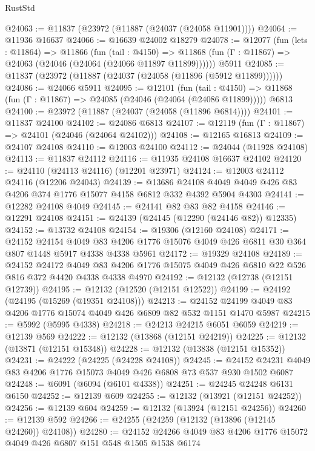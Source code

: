 \begin{lexlean}{RustStd}
\begin{coremodule}
{\begin{coremodule}
{{{{{{{{{{{{{{{{{{{{{{{{{{{{{{{{{{{{{{{{{{{{{{{{{{@24063 := @11837 (@23972 (@11887 (@24037 (@24058 @11901))))
@24064 := @11936 @16637
@24066 := @16639 @24002 @18279
@24078 := @12077
    (fun (lets : @11864) =>
    @11866
      (fun (tail : @4150) =>
      @11868 (fun (Γ : @11867) => @24063 (@24046 (@24064 (@24066 @11897 @11899))))))
    @5911
@24085 := @11837 (@23972 (@11887 (@24037 (@24058 (@11896 (@5912 @11899))))))
@24086 := @24066 @5911
@24095 := @12101
    (fun (tail : @4150) => @11868 (fun (Γ : @11867) => @24085 (@24046 (@24064 (@24086 @11899)))))
    @6813
@24100 := @23972 (@11887 (@24037 (@24058 (@11896 @6814))))
@24101 := @11837 @24100
@24102 := @24086 @6813
@24107 := @12119 (fun (Γ : @11867) => @24101 (@24046 (@24064 @24102)))
@24108 := @12165 @16813
@24109 := @24107 @24108
@24110 := @12003 @24100
@24112 := @24044 (@11928 @24108)
@24113 := @11837 @24112
@24116 := @11935 @24108 @16637 @24102
@24120 := @24110 (@24113 @24116) (@12201 @23971)
@24124 := @12003 @24112 @24116 (@12206 @24043)
@24139 := @13686
    @24108
    @4049
    @4049
    @426
    @83
    @4206
    @374
    @1776
    @15077
    @4158
    @6812
    @332
    @4392
    @5904
    @4303
@24141 := @12282 @24108 @4049
@24145 := @24141 @82 @83 @82 @4158
@24146 := @12291 @24108
@24151 := @24139 (@24145 (@12290 (@24146 @82)) @12335)
@24152 := @13732 @24108
@24154 := @19306 (@12160 @24108)
@24171 := @24152
    @24154
    @4049
    @83
    @4206
    @1776
    @15076
    @4049
    @426
    @6811
    @30
    @364
    @807
    @1448
    @5917
    @4338
    @4338
    @5961
@24172 := @19329 @24108
@24189 := @24152
    @24172
    @4049
    @83
    @4206
    @1776
    @15075
    @4049
    @426
    @6810
    @22
    @526
    @816
    @372
    @4420
    @4338
    @4338
    @4970
@24192 := @12132 (@12738 (@12151 @12739))
@24195 := @12132 (@12520 (@12151 @12522))
@24199 := @24192 (@24195 (@15269 (@19351 @24108)))
@24213 := @24152 @24199 @4049 @83 @4206 @1776 @15074 @4049 @426 @6809 @82 @532 @1151 @1470 @5987
@24215 := @5992 (@5995 @4338)
@24218 := @24213 @24215 @6051 @6059
@24219 := @12139 @569
@24222 := @12132 (@13868 (@12151 @24219))
@24225 := @12132 (@13871 (@12151 @15348))
@24228 := @12132 (@13838 (@12151 @15352))
@24231 := @24222 (@24225 (@24228 @24108))
@24245 := @24152 @24231 @4049 @83 @4206 @1776 @15073 @4049 @426 @6808 @73 @537 @930 @1502 @6087
@24248 := @6091 (@6094 (@6101 @4338))
@24251 := @24245 @24248 @6131 @6150
@24252 := @12139 @609
@24255 := @12132 (@13921 (@12151 @24252))
@24256 := @12139 @604
@24259 := @12132 (@13924 (@12151 @24256))
@24260 := @12139 @592
@24266 := @24255 (@24259 (@12132 (@13896 (@12145 @24260)) @24108))
@24280 := @24152 @24266 @4049 @83 @4206 @1776 @15072 @4049 @426 @6807 @151 @548 @1505 @1538 @6174
}}}}}}}}}}}}}}}}}}}}}}}}}}}}}}}}}}}}}}}}}}}}}}}}}}
\end{coremodule}}
\end{coremodule}
\end{lexlean}
